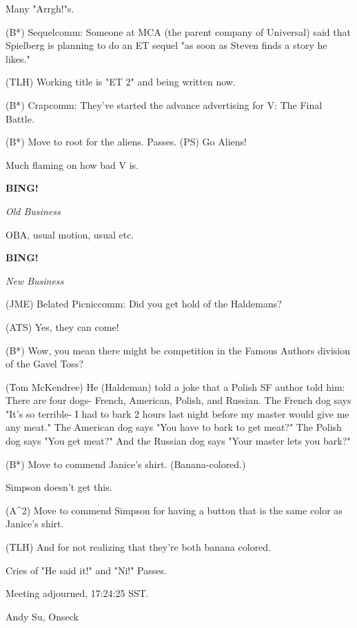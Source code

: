 \documentclass[12pt]{article}
\newcommand{\bing}{{\bf BING!} }
\newcommand{\goto}[1]{\bing \vskip 12pt \centerline{{\em{#1}}}}
\begin{document}
Many "Arrgh!"s.

(B*) Sequelcomm: Someone at MCA (the parent company of Universal) said that Spielberg is planning to do an ET sequel "as soon as Steven finds a story he likes."

(TLH) Working title is "ET 2" and being written now.

(B*) Crapcomm: They've started the advance advertising for V: The Final Battle.

(B*) Move to root for the aliens. Passes. (PS) Go Aliens!

Much flaming on how bad V is.

\goto{Old Business}

OBA, usual motion, usual etc.

\goto{New Business}

(JME) Belated Picniccomm: Did you get hold of the Haldemans?

(ATS) Yes, they can come!

(B*) Wow, you mean there might be competition in the Famous Authors division of the Gavel Toss?

(Tom McKendree) He (Haldeman) told a joke that a Polish SF author told him: There are four dogs- French, American, Polish, and Russian. The French dog says "It's so terrible- I had to bark 2 hours last night before my master would give me any meat." The American dog says "You have to bark to get meat?" The Polish dog says "You get meat?" And the Russian dog says "Your master lets you bark?"

(B*) Move to commend Janice's shirt. (Banana-colored.)

Simpson doesn't get this.

(A^2) Move to commend Simpson for having a button that is the same color as Janice's shirt.

(TLH) And for not realizing that they're both banana colored.

Cries of "He said it!" and "Ni!" Passes.

\vspace{12pt}

\noindent
Meeting adjourned, 17:24:25 SST.

\vspace{18pt}

\centerline{Andy Su, Onseck}
\end{document}

